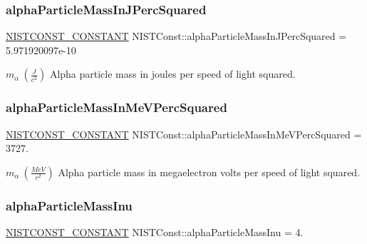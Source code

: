 \subsubsection{\texorpdfstring{alpha\+Particle\+Mass\+In\+J\+Perc\+Squared}{alphaParticleMassInJPercSquared}}
{\footnotesize\ttfamily \mbox{\hyperlink{_n_i_s_t_const_8hpp_a2b0fc1d7452373f816175dd86ce26729}{N\+I\+S\+T\+C\+O\+N\+S\+T\+\_\+\+C\+O\+N\+S\+T\+A\+NT}} N\+I\+S\+T\+Const\+::alpha\+Particle\+Mass\+In\+J\+Perc\+Squared = 5.\+971920097e-\/10}

$m_\alpha \ (\frac{J}{c^2})$ Alpha particle mass in joules per speed of light squared. \mbox{\label{group___n_i_s_t_const-_alpha_ga76e0b9c7ad08a1100b5b358560ab7adb}} 
\subsubsection{\texorpdfstring{alpha\+Particle\+Mass\+In\+Me\+V\+Perc\+Squared}{alphaParticleMassInMeVPercSquared}}
{\footnotesize\ttfamily \mbox{\hyperlink{_n_i_s_t_const_8hpp_a2b0fc1d7452373f816175dd86ce26729}{N\+I\+S\+T\+C\+O\+N\+S\+T\+\_\+\+C\+O\+N\+S\+T\+A\+NT}} N\+I\+S\+T\+Const\+::alpha\+Particle\+Mass\+In\+Me\+V\+Perc\+Squared = 3727.}

$m_\alpha \ (\frac{MeV}{c^2})$ Alpha particle mass in megaelectron volts per speed of light squared. \mbox{\label{group___n_i_s_t_const-_alpha_gabece6c12566a76b12a7d4c14f7020afb}} 
\subsubsection{\texorpdfstring{alpha\+Particle\+Mass\+Inu}{alphaParticleMassInu}}
{\footnotesize\ttfamily \mbox{\hyperlink{_n_i_s_t_const_8hpp_a2b0fc1d7452373f816175dd86ce26729}{N\+I\+S\+T\+C\+O\+N\+S\+T\+\_\+\+C\+O\+N\+S\+T\+A\+NT}} N\+I\+S\+T\+Const\+::alpha\+Particle\+Mass\+Inu = 4.}

